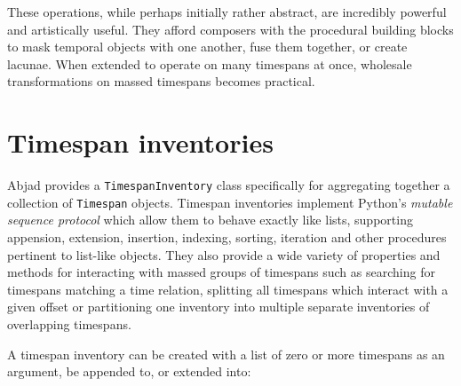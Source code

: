 \noindent These operations, while perhaps initially rather abstract, are
incredibly powerful and artistically useful. They afford composers with the
procedural building blocks to mask temporal objects with one another, fuse them
together, or create lacunae. When extended to operate on many timespans at
once, wholesale transformations on massed timespans becomes practical.

\section{Timespan inventories}

Abjad provides a \texttt{TimespanInventory} class specifically for aggregating
together a collection of \texttt{Timespan} objects. Timespan inventories
implement Python's \emph{mutable sequence protocol} which allow them to behave
exactly like lists, supporting appension, extension, insertion, indexing,
sorting, iteration and other procedures pertinent to list-like objects. They
also provide a wide variety of properties and methods for interacting with
massed groups of timespans such as searching for timespans matching a time
relation, splitting all timespans which interact with a given offset or
partitioning one inventory into multiple separate inventories of overlapping
timespans.

A timespan inventory can be created with a list of zero or more timespans as an
argument, be appended to, or extended into:

\begin{comment}
<abjad>
timespan_inventory = timespantools.TimespanInventory([
    timespantools.Timespan(0, 16),
    ])
timespan_inventory.append(timespantools.Timespan(5, 12))
timespan_inventory.extend([
    timespantools.Timespan(-2, 8),
    timespantools.Timespan(15, 20),
    ])
print(format(timespan_inventory))
show(timespan_inventory)
</abjad>
\end{comment}

